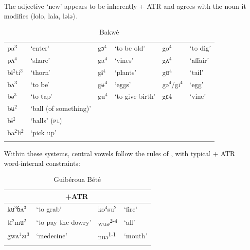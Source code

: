 \documentclass[output=paper
,newtxmath
,modfonts
,nonflat]{langsci/langscibook}
\begin{document}
The adjective ‘new’ appears to be inherently + ATR and agrees with the noun it modifies (lolo, lala, lələ).

\begin{table}
\caption{Bakwé \citep{centredetraduction2006}}
\label{tab:zogbo:7}
\begin{tabular}{llllll}
\lsptoprule
  pa$^3$ &   ‘enter’  &  gɔ$^4$    & ‘to be old’ &  go$^4$ &    ‘to dig’\\

  pʌ$^4$  &   ‘share’    & ga$^4$ &   ‘vines’     & gʌ$^4$ &    ‘affair’\\

  bɨ$^2$ti$^3$ & ‘thorn’ &    gɨ$^4$ &   ‘plants’  & gʊ$^4$ &    ‘tail’\\

  bʌ$^3$ & ‘to be’ &    gʉ$^4$ &   ‘eggs’  &   gə$^4$/gɪ$^4$ & ‘egg’\\

  bə$^3$ & ‘to tap’ &    gu$^4$   & ‘to give birth’ &  gɛ4  &   ‘vine’\\

  bʉ$^2$ & ‘ball (of something)’\\

  bɨ$^2$ & ‘balls’ (\textsc{pl})\\

  ba$^2$li$^2$ & ‘pick up’\\
\lspbottomrule
\end{tabular}
\end{table}

Within these systems, central vowels follow the rules of , with typical + ATR word-internal constraints:   

\begin{table}
\caption{ Guibéroua Bété \citep{Werle1976}}
\label{tab:zogbo:8}
\begin{tabular}{llll}
\lsptoprule
\multicolumn{2}{c}{-ATR} & \multicolumn{2}{c}{+ATR}\\
\midrule
kʉ$^3$ɓʌ$^3$ &  ‘to grab’ &      ko$^4$su$^2$ &   ‘fire’\\

tɪ$^2$mʉ$^2$ & ‘to pay the dowry’  &  wuə\textsuperscript{2-4} & ‘all’\\

gwʌ$^1$zɪ$^3$ &  ‘medecine’      & nuə\textsuperscript{1-1}  &   ‘mouth’\\
\lspbottomrule
\end{tabular}
\end{table}
\end{document}
